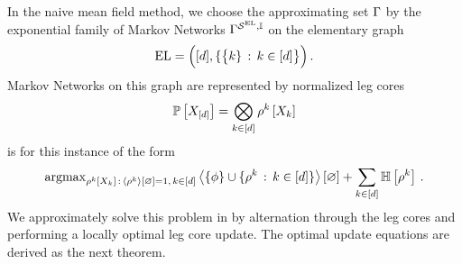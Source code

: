 
In the naive mean field method, we choose the approximating set $\Gamma$ by the exponential family of Markov Networks $\Gamma^{\mathcal{S}^{\mathrm{EL}},\mathbb{I}}$ on the elementary graph %
\begin{align*}
    \mathrm{EL}=\Big([d],\{\big\{k\}\,:\, k\in[d]\big\}\Big) \, .
\end{align*}
Markov Networks on this graph are represented by normalized leg cores
\begin{align*}
    \mathbb{P}\left[X_{[d]}\right]
    = \bigotimes_{k\in[d]} \rho^{k}\left[X_{k}\right]
\end{align*}
 is for this instance of the form
\begin{align*}
    \mathrm{argmax}_{\rho^{k}\left[X_{k}\right] \,:\, \left\langle \rho^{k}\right\rangle \left[ \varnothing \right]=1,\, k\in[d]}
    \left\langle \{\phi\} \cup \{\rho^{k} \,:\, k\in[d]\}\right\rangle \left[ \varnothing \right]
    + \sum_{k\in[d]} \mathbb{H}\left[\rho^{k}\right] \, .
\end{align*}
We approximately solve this problem in  by alternation through the leg cores and performing a locally optimal leg core update.
The optimal update equations are derived as the next theorem.

